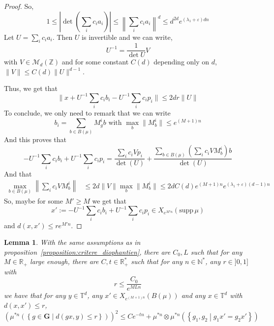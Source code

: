 \documentclass[11pt]{amsart}
\newtheorem{lemma}[theorem]{Lemma}
\theoremstyle{definition}
\theoremstyle{remark}
\numberwithin{equation}{section}
\begin{document}
\begin{proof}
So,
\[
1 \leqslant \left|\det\left( \sum_i c_i a_i\right)\right| \leqslant \left\|\sum_i c_i a_i\right\|^d \leqslant d^{2d} e^{(\lambda_1 + \varepsilon)dn}
\]
Let $U = \sum_i c_i a_i$. Then $U$ is invertible and we can write,
\[
U^{-1} = \frac 1 {\det U} V
\]
with $V \in \mathcal{M}_d({\mathbb Z})$ and for some constant $C(d)$ depending only on $d$, $\|V\| \leqslant C(d)\|U\|^{d-1}$.

Thus, we get that
\[
\|x+U^{-1} \sum_i c_i b_i - U^{-1}\sum_i c_ip_i \| \leqslant 2dr\|U\|
\]
To conclude, we only need to remark that we can write
\[
b_i = \sum_{b \in B(\mu)} M_g^i b \text{ with }\max_b \|M_b^i\|\leqslant e^{(M+1)n}
\]
And this proves that
\[
-U^{-1}\sum_i c_i b_i +U^{-1} \sum_i c_i p_i =\frac{ \sum_i c_i V p_i}{\det(U)} + \frac{ \sum_{b\in B( \mu)} \left(\sum_i c_i VM_b^i\right)b } {\det(U)}
\]
And that
\begin{align*}
\max_{b\in B(\mu)} \left\| \sum_i c_i V M_b^i\right\| &\leqslant 2d \|V\| \max_{b}\|M_b^i\| \leqslant 2d C(d) e^{(M+1)n} e^{(\lambda_1 + \varepsilon)(d-1)n}
\end{align*}
So, maybe for some $M'\geqslant M$ we get that
\[
x':=-U^{-1}\sum_i c_i b_i +U^{-1} \sum_i c_i p_i  \in X_{e^{M'n}}({\mathrm{supp}\,}\mu)
\]
and $d(x,x') \leqslant re^{M'n}$.
\end{proof}

\begin{lemma}\label{lemma:diophantien}
With the same assumptions as in proposition~\ref{proposition:critere_diophantien}, there are $C_0,L$ such that for any $M\in {\mathbb R}_+$ large enough, there are $C,t\in {\mathbb R}_+^\ast$ such that for any $n\in {\mathbb N}^\ast$, any $r\in ]0,1]$ with
\[
r \leqslant \frac {C_0}{e^{MLn}}
\]
we have that for any $y\in {\mathbb T}^d$, any $x'\in X_{e^{(M+1)n}}(B(\mu))$ and any $x\in {\mathbb T}^d$ with $d(x,x')\leqslant r$,
\[
\left(\mu^{\ast n}\left(\left\{ g\in {\mathbf G}\middle| d(gx,y) \leqslant r\right\}\right) \right)^2\leqslant Ce^{-tn} + \mu^{\ast n}\otimes \mu^{\ast n}\left(\left\{g_1,g_2 \middle| g_1x'=g_2 x'\right\} \right)
\]
\end{lemma}
\end{document}
